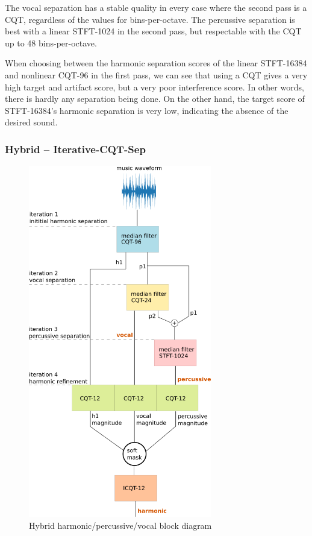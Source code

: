 \documentclass[letter,12pt]{article}
\begin{document}
The vocal separation has a stable quality in every case where the second pass is a CQT, regardless of the values for bins-per-octave. The percussive separation is best with a linear STFT-1024 in the second pass, but respectable with the CQT up to 48 bins-per-octave.

When choosing between the harmonic separation scores of the linear STFT-16384 and nonlinear CQT-96 in the first pass, we can see that using a CQT gives a very high target and artifact score, but a very poor interference score. In other words, there is hardly any separation being done. On the other hand, the target score of STFT-16384's harmonic separation is very low, indicating the absence of the desired sound.

\vfill
\clearpage %

\subsubsection{Hybrid -- Iterative-CQT-Sep}
\label{sec:hybridvocal}

\begin{figure}
	\includegraphics[width=8cm]{./hybrid_vocal_block_diagram.png}
	\caption{Hybrid harmonic/percussive/vocal block diagram}
	\label{fig:hybridvocal}
\end{figure}
\end{document}
